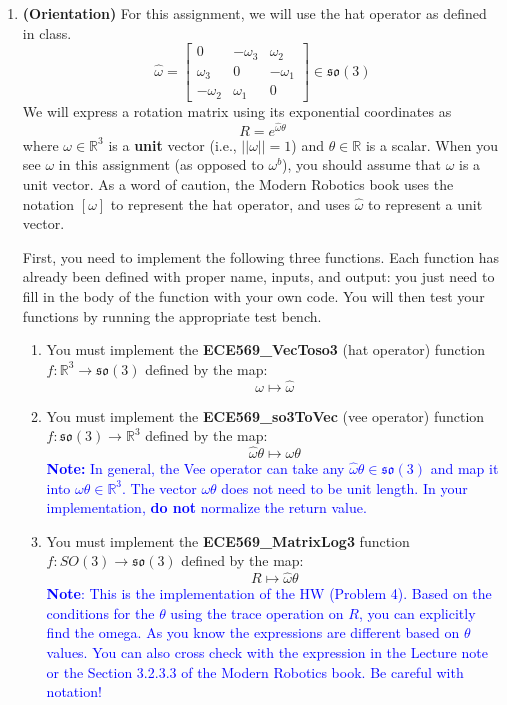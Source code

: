 \documentclass{article}
\numberwithin{figure}{section}
\begin{document}
\begin{enumerate}[label=(\alph*)]
\newpage
\item \textbf{(Orientation)} For this assignment, we will use the hat operator as defined in class.
$$\widehat\omega = \begin{bmatrix}
        0 & -\omega_3 & \omega_2 \\
        \omega_3 & 0 & -\omega_1 \\
        -\omega_2 & \omega_1 & 0
    \end{bmatrix} \in \mathfrak{so}(3)$$
We will express a rotation matrix using its exponential coordinates as
\begin{equation}
    R = e^{\widehat \omega \theta}
\end{equation}
where $\omega \in \mathbb{R}^3$ is a \textbf{unit} vector (i.e., $||\omega|| = 1$) and $\theta \in \mathbb{R}$ is a scalar. When you see $\omega$ in this assignment (as opposed to $\omega^b$), you should assume that $\omega$ is a unit vector. As a word of caution, the Modern Robotics book uses the notation $[\omega]$ to represent the hat operator, and uses $\hat \omega$ to represent a unit vector.

First, you need to implement the following three functions. Each function has already been defined with proper name, inputs, and output: you just need to fill in the body of the function with your own code. You will then test your functions by running the appropriate test bench.
\begin{enumerate}[label=\arabic*.]
\item You must implement the \textbf{ECE569\_VecToso3} (hat operator) function $f : \mathbb{R}^3 \to \mathfrak{so}(3)$ defined by the map:
$$\omega \mapsto \widehat\omega$$

\item You must implement the \textbf{ECE569\_so3ToVec} (vee operator) function $f : \mathfrak{so}(3) \rightarrow \mathbb{R}^3$ defined by the map:
$$\widehat\omega \theta \mapsto \omega \theta$$
\textcolor{blue}{
\textbf{Note:} In general, the Vee operator can take any $\widehat\omega \theta \in \mathfrak{so}(3)$ and map it into $\omega \theta \in \mathbb{R}^3$. The vector $\omega \theta$ does not need to be unit length. In your implementation, \textbf{do not} normalize the return value. 
}


\item You must implement the \textbf{ECE569\_MatrixLog3} function $f: SO(3) \to \mathfrak{so}(3)$ defined by the map: 
$$R \mapsto \widehat\omega \theta$$
\textcolor{blue}{\textbf{Note}: This is the implementation of the HW (Problem 4). Based on the conditions for the $\theta$ using the trace operation on $R$, you can explicitly find the omega. As you know the expressions are different based on $\theta$ values. You can also cross check with the expression in the Lecture note or the Section 3.2.3.3 of the Modern Robotics book. Be careful with notation!
}




\end{enumerate}
\end{enumerate}
\end{document}
